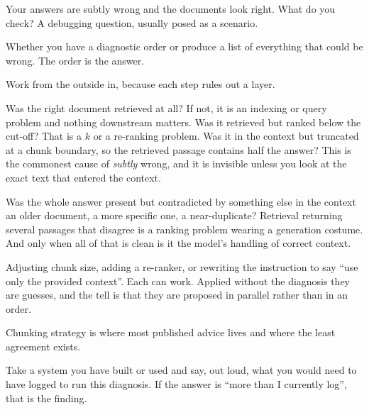 \begin{bankq}{Your answers are subtly wrong and the documents look right. What do you check?}
\qasked
A debugging question, usually posed as a scenario.

\qtested
Whether you have a diagnostic order or produce a list of everything that could
be wrong. The order is the answer.

\qstaff
Work from the outside in, because each step rules out a layer.

Was the right document retrieved at all? If not, it is an indexing or query
problem and nothing downstream matters. Was it retrieved but ranked below the
cut-off? That is a $k$ or a re-ranking problem. Was it in the context but
truncated at a chunk boundary, so the retrieved passage contains half the
answer? This is the commonest cause of \emph{subtly} wrong, and it is invisible
unless you look at the exact text that entered the context.

Was the whole answer present but contradicted by something else in the context
\dash{} an older document, a more specific one, a near-duplicate? Retrieval
returning several passages that disagree is a ranking problem wearing a
generation costume. And only when all of that is clean is it the model's
handling of correct context.


\qsenior
Adjusting chunk size, adding a re-ranker, or rewriting the instruction to say
``use only the provided context''. Each can work. Applied without the diagnosis
they are guesses, and the tell is that they are proposed in parallel rather
than in an order.

\qcontested
Chunking strategy is where most published advice lives and where the least
agreement exists. 

\qdrill
Take a system you have built or used and say, out loud, what you would need to
have logged to run this diagnosis. If the answer is ``more than I currently
log'', that is the finding.
\end{bankq}

